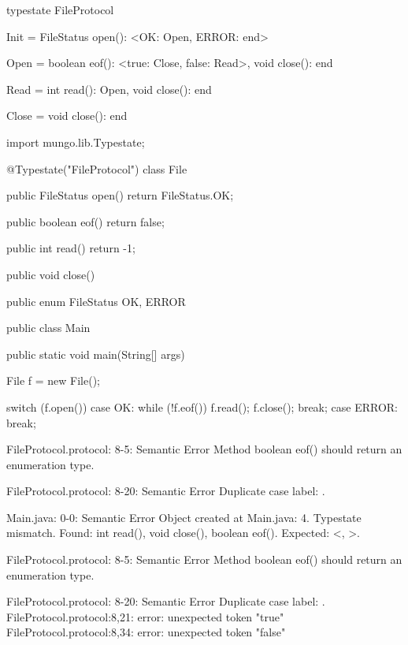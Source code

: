 \begin{code}
typestate FileProtocol {

  Init = {
    FileStatus open(): <OK: Open, ERROR: end>
  }

  Open = {
    boolean eof(): <true: Close, false: Read>,
    void close(): end
  }

  Read = {
    int read(): Open,
    void close(): end
  }

  Close = {
    void close(): end
  }

}\end{code}

\begin{code}
import mungo.lib.Typestate;

@Typestate("FileProtocol")
class File {

  public FileStatus open() {
    return FileStatus.OK;
  }

  public boolean eof() {
    return false;
  }

  public int read() {
    return -1;
  }

  public void close() {
  }

}\end{code}

\begin{code}
public enum FileStatus {
  OK, ERROR
}\end{code}

\begin{code}
public class Main {

  public static void main(String[] args) {
    File f = new File();

    switch (f.open()) {
      case OK:
        while (!f.eof()) {
          f.read();
        }
        f.close();
        break;
      case ERROR:
        break;
    }
  }

}\end{code}

\lstset{caption=Original Mungo output}
\begin{code}

FileProtocol.protocol: 8-5: Semantic Error
		Method boolean eof() should return an enumeration type.

FileProtocol.protocol: 8-20: Semantic Error
		Duplicate case label: .

Main.java: 0-0: Semantic Error
		Object created at Main.java: 4. Typestate mismatch. Found: int read(), void close(), boolean eof(). Expected: <, >.

FileProtocol.protocol: 8-5: Semantic Error
		Method boolean eof() should return an enumeration type.

FileProtocol.protocol: 8-20: Semantic Error
		Duplicate case label: .
FileProtocol.protocol:8,21: error: unexpected token "true"
FileProtocol.protocol:8,34: error: unexpected token "false"
\end{code}

\lstset{caption=New Mungo output}
\begin{code}
\end{code}

